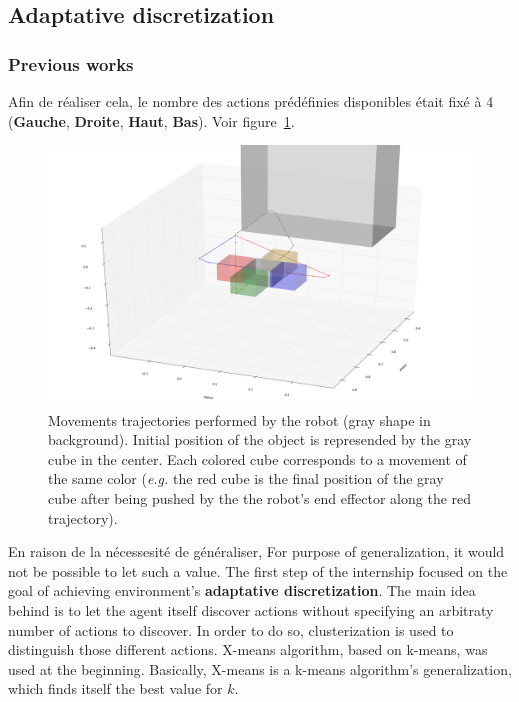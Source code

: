 \documentclass{llncs}
\begin{document}

\subsection{Adaptative discretization}

\subsubsection{Previous works}

Afin de réaliser cela, le nombre des actions prédéfinies disponibles était fixé à 4 (\textbf{Gauche}, \textbf{Droite}, \textbf{Haut}, \textbf{Bas}). Voir figure~\ref{fig:trajectories}.

\begin{figure}
	\centering
	\includegraphics[width=\textwidth]{figures/trajectories}
	\caption{Movements trajectories performed by the robot (gray shape in background). Initial position of the object is represended by the gray cube in the center. Each colored cube corresponds to a movement of the same color (\textit{e.g.} the red cube is the final position of the gray cube after being pushed by the the robot's end effector along the red trajectory).}
	\label{fig:trajectories}
\end{figure}

En raison de la nécessesité de généraliser,
For purpose of generalization, it would not be possible to let such a value. The first step of the internship focused on the goal of achieving environment's \textbf{adaptative discretization}. The main idea behind is to let the agent itself discover actions without specifying an arbitraty number of actions to discover.  In order to do so, clusterization is used to distinguish those different actions. X-means algorithm\cite{Pelleg:2000:XEK:645529.657808}, based on k-means, was used at the beginning. Basically, X-means is a k-means algorithm's generalization, which finds itself the best value for $k$.
\end{document}
